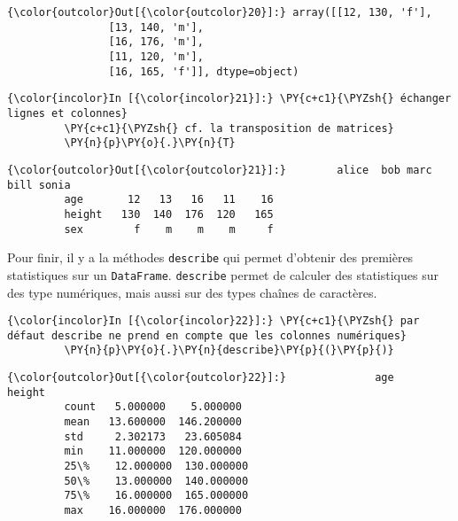 \begin{Verbatim}[commandchars=\\\{\},frame=single,framerule=0.3mm,rulecolor=\color{cellframecolor}]
{\color{outcolor}Out[{\color{outcolor}20}]:} array([[12, 130, 'f'],
                [13, 140, 'm'],
                [16, 176, 'm'],
                [11, 120, 'm'],
                [16, 165, 'f']], dtype=object)
\end{Verbatim}
            
    \begin{Verbatim}[commandchars=\\\{\},frame=single,framerule=0.3mm,rulecolor=\color{cellframecolor}]
{\color{incolor}In [{\color{incolor}21}]:} \PY{c+c1}{\PYZsh{} échanger lignes et colonnes}
         \PY{c+c1}{\PYZsh{} cf. la transposition de matrices}
         \PY{n}{p}\PY{o}{.}\PY{n}{T}
\end{Verbatim}


\begin{Verbatim}[commandchars=\\\{\},frame=single,framerule=0.3mm,rulecolor=\color{cellframecolor}]
{\color{outcolor}Out[{\color{outcolor}21}]:}        alice  bob marc bill sonia
         age       12   13   16   11    16
         height   130  140  176  120   165
         sex        f    m    m    m     f
\end{Verbatim}
            
    Pour finir, il y a la méthodes \texttt{describe} qui permet d'obtenir
des premières statistiques sur un \texttt{DataFrame}. \texttt{describe}
permet de calculer des statistiques sur des type numériques, mais aussi
sur des types chaînes de caractères.

    \begin{Verbatim}[commandchars=\\\{\},frame=single,framerule=0.3mm,rulecolor=\color{cellframecolor}]
{\color{incolor}In [{\color{incolor}22}]:} \PY{c+c1}{\PYZsh{} par défaut describe ne prend en compte que les colonnes numériques}
         \PY{n}{p}\PY{o}{.}\PY{n}{describe}\PY{p}{(}\PY{p}{)}
\end{Verbatim}


\begin{Verbatim}[commandchars=\\\{\},frame=single,framerule=0.3mm,rulecolor=\color{cellframecolor}]
{\color{outcolor}Out[{\color{outcolor}22}]:}              age      height
         count   5.000000    5.000000
         mean   13.600000  146.200000
         std     2.302173   23.605084
         min    11.000000  120.000000
         25\%    12.000000  130.000000
         50\%    13.000000  140.000000
         75\%    16.000000  165.000000
         max    16.000000  176.000000
\end{Verbatim}
            

